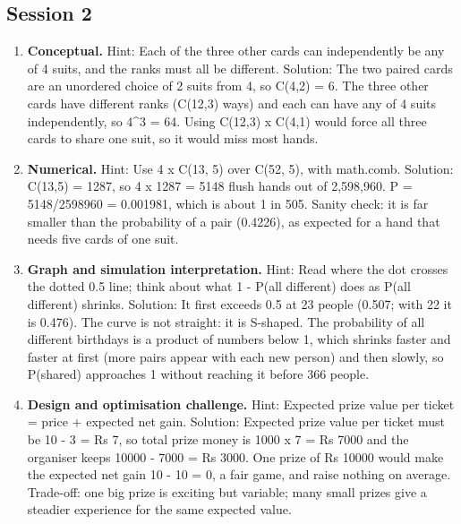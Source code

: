 \documentclass[11pt,a4paper]{article}
\begin{document}
\subsection*{Session 2}
\begin{enumerate}[nosep]
\item \textbf{Conceptual.} Hint: Each of the three other cards can independently be any of 4 suits, and the ranks must all be different. Solution: The two paired cards are an unordered choice of 2 suits from 4, so C(4,2) = 6. The three other cards have different ranks (C(12,3) ways) and each can have any of 4 suits independently, so 4\textasciicircum{}3 = 64. Using C(12,3) x C(4,1) would force all three cards to share one suit, so it would miss most hands.
\item \textbf{Numerical.} Hint: Use 4 x C(13, 5) over C(52, 5), with math.comb. Solution: C(13,5) = 1287, so 4 x 1287 = 5148 flush hands out of 2,598,960. P = 5148/2598960 = 0.001981, which is about 1 in 505. Sanity check: it is far smaller than the probability of a pair (0.4226), as expected for a hand that needs five cards of one suit.
\item \textbf{Graph and simulation interpretation.} Hint: Read where the dot crosses the dotted 0.5 line; think about what 1 - P(all different) does as P(all different) shrinks. Solution: It first exceeds 0.5 at 23 people (0.507; with 22 it is 0.476). The curve is not straight: it is S-shaped. The probability of all different birthdays is a product of numbers below 1, which shrinks faster and faster at first (more pairs appear with each new person) and then slowly, so P(shared) approaches 1 without reaching it before 366 people.
\item \textbf{Design and optimisation challenge.} Hint: Expected prize value per ticket = price + expected net gain. Solution: Expected prize value per ticket must be 10 - 3 = Rs 7, so total prize money is 1000 x 7 = Rs 7000 and the organiser keeps 10000 - 7000 = Rs 3000. One prize of Rs 10000 would make the expected net gain 10 - 10 = 0, a fair game, and raise nothing on average. Trade-off: one big prize is exciting but variable; many small prizes give a steadier experience for the same expected value.
\end{enumerate}
\end{document}
